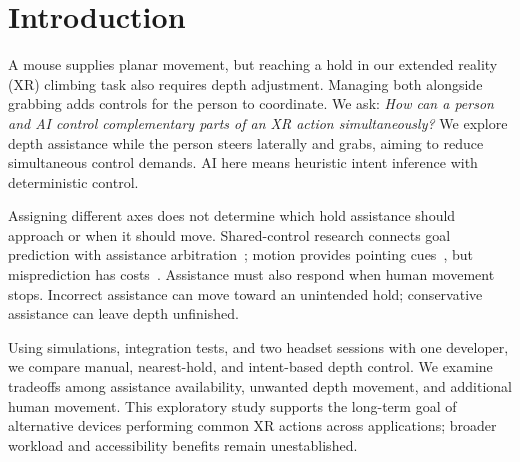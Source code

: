 \section{Introduction}

A mouse supplies planar movement, but reaching a hold in our extended reality
(XR) climbing task also requires depth adjustment. Managing both alongside
grabbing adds controls for the person to coordinate. We ask: \emph{How can a
person and AI control complementary parts of an XR action simultaneously?}
We explore depth assistance while the person steers laterally and grabs,
aiming to reduce simultaneous control demands. AI here means heuristic intent
inference with deterministic control.

Assigning different axes does not determine which hold assistance should
approach or when it should move. Shared-control research connects goal
prediction with assistance arbitration~\cite{losey2018review,dragan2013policy,javdani2018shared};
motion provides pointing cues~\cite{lank2007endpoint}, but misprediction has
costs~\cite{ruiz2010speeding}. Assistance must also respond when human movement
stops. Incorrect assistance can move toward an unintended hold; conservative
assistance can leave depth unfinished.

Using simulations, integration tests, and two headset sessions with one
developer, we compare manual, nearest-hold, and intent-based depth control.
We examine tradeoffs among assistance availability, unwanted depth movement,
and additional human movement. This exploratory study supports the long-term
goal of alternative devices performing common XR actions across applications;
broader workload and accessibility benefits remain unestablished.
